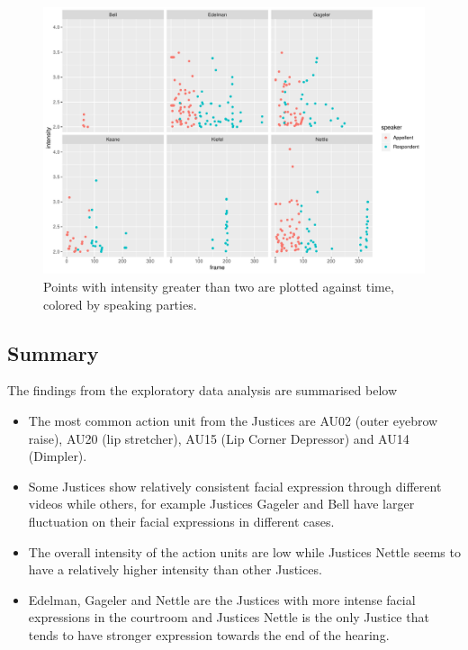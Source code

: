 \documentclass{monashthesis}
\begin{document}
\begin{figure}

{\centering \includegraphics[width=1\linewidth]{figures/high-intensity-points-1} 

}

\caption{Points with intensity greater than two are plotted against time, colored by speaking parties. }\label{fig:high-intensity-points}
\end{figure}

\newpage

\hypertarget{summary}{%
\subsection{Summary}\label{summary}}

The findings from the exploratory data analysis are summarised below

\begin{itemize}
\item
  The most common action unit from the Justices are AU02 (outer eyebrow raise), AU20 (lip stretcher), AU15 (Lip Corner Depressor) and AU14 (Dimpler).
\item
  Some Justices show relatively consistent facial expression through different videos while others, for example Justices Gageler and Bell have larger fluctuation on their facial expressions in different cases.
\item
  The overall intensity of the action units are low while Justices Nettle seems to have a relatively higher intensity than other Justices.
\item
  Edelman, Gageler and Nettle are the Justices with more intense facial expressions in the courtroom and Justices Nettle is the only Justice that tends to have stronger expression towards the end of the hearing.
\end{itemize}
\end{document}

